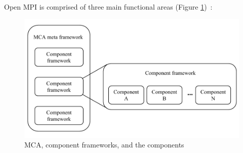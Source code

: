 Open MPI is comprised of three main functional areas (Figure \ref{fig:MCA_framework})~\cite{graham2006open}:

\begin{figure}[h!]
\centering
\includegraphics[scale=0.4]{images/MCA_framework.png}
\caption[MCA, component frameworks, and the components]{MCA, component frameworks, and the components~\cite{graham2006open}}
\label{fig:MCA_framework}
\end{figure}

